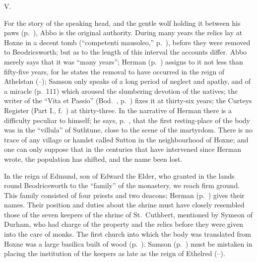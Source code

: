 \documentclass[10pt]{book}
\begin{document}
{\vspace{.3cm}
\begin{center}
V.
\end{center}
\noindent For the story of the speaking head, and the gentle wolf holding it between his paws (p.\ ), Abbo is the original authority. During many years the relics lay  at Hoxne in a decent tomb (``competenti mausoleo,'' p.\ ), before they were removed to Beodricsworth; but as to the length of this interval the accounts differ. Abbo merely says that it was ``many years''; Herman (p.\ ) assigns to it not less than fifty-five years, for he states the removal to have occurred in the reign of Athelstan (--); Samson only speaks of a long period of neglect and apathy, and of a miracle (p.\ 111) which aroused the slumbering devotion of the natives; the writer of the ``Vita et Passio'' (Bod.\ , p.\ ) fixes it at thirty-six years; the Curteys Register (Part I., f.\ ) at thirty-three. In the narrative of Herman there is a difficulty peculiar to himself; he says, p.\ , that the first resting-place of the body was in the ``villula'' of Suthtune, close to the scene of the martyrdom. There is no trace of any village or hamlet called Sutton in the neighbourhood of Hoxne; and one can only suppose that in the centuries that have intervened since Herman wrote, the population has shifted, and the name been lost.

In the reign of Edmund, son of Edward the Elder, who granted in  the lands round Beodricsworth to the ``family'' of the monastery, we reach firm ground. This family consisted of four priests and two deacons; Herman (p.\ ) gives their names. Their position and duties about the shrine must have closely resembled those of the seven keepers of the shrine of St.\ Cuthbert, mentioned by Symeon of Durham, who had charge of the property and the relics before they were given into the care of monks. The first church into which the body was translated from Hoxne was a large basilica built of wood (p.\ ). Samson (p.\ ) must be mistaken in placing the institution of the keepers as late as the reign of Ethelred (--).

}
\end{document}
